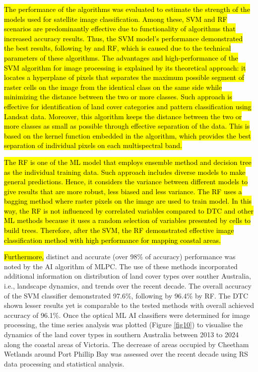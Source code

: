 \documentclass[jmse,article,submit,pdftex,moreauthors]{Definitions/mdpi}
\begin{document}
\hl{The performance of the algorithms was evaluated to estimate the strength of the models used for satellite image classification. Among these, SVM and RF scenarios are predominantly effective due to functionality of algorithms that increased accuracy results. Thus, the SVM model's performance demonstrated the best results, following by and RF, which is caused due to the technical parameters of these algorithms. The advantages and high-performance of the SVM algorithm for image processing is explained by its theoretical approach: it locates a hyperplane of pixels that separates the maximum possible segment of raster cells on the image from the identical class on the same side while minimizing the distance between the two or more classes. Such approach is effective for identification of land cover categories and pattern classification using Landsat data. Moreover, this algorithm keeps the distance between the two or more classes as small as possible through effective separation of the data. This is based on the kernel function embedded in the algorithm, which provides the best separation of individual pixels on each multispectral band.} 

\hl{The RF is one of the ML model that employs ensemble method and decision tree as the individual training data. Such approach includes diverse models to make general predictions. Hence, it considers the variance between different models to give results that are more robust, less biased and less variance. The RF uses a bagging method where raster pixels on the image are used to train model. In this way, the RF is not influenced by correlated variables compared to DTC and other ML methods because it uses a random selection of variables presented by cells to build trees. Therefore, after the SVM, the RF  demonstrated effective image classification method with high performance for mapping coastal areas.}

\hl{Furthermore, }distinct and accurate (over 98\% of accuracy) performance was noted by the AI algorithm of MLPC. The use of these methods incorporated additional information on distribution of land cover types over souther Australia, i.e., landscape dynamics, and trends over the recent decade. The overall accuracy of the SVM classifier demonstrated 97.6\%, following by 96.4\% by RF. The DTC shown lesser results yet is comparable to the tested methods with overall achieved accuracy of 96.1\%. Once the optical ML AI classifiers were determined for image processing, the time series analysis was plotted (Figure \ref{fig10}) to visualise the dynamics of the land cover types in southern Australia between 2013 to 2024 along the coastal areas of Victoria. The decrease of areas occupied by Cheetham Wetlands around Port Phillip Bay was assessed over the recent decade using RS data processing and statistical analysis.
\end{document}
